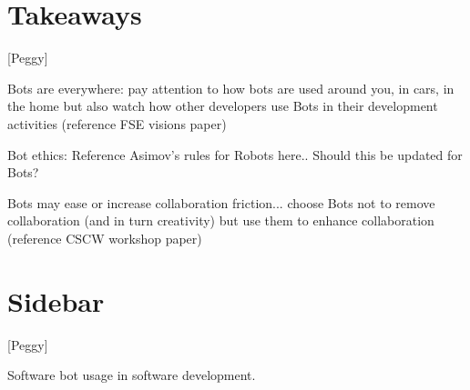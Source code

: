 \documentclass{sig-alternate}
\begin{document}
\section{Takeaways}

[Peggy]

	Bots are everywhere: pay attention to how bots are used around you, in cars, in the home but also watch how other developers use Bots in their development activities (reference FSE visions paper)
	
	Bot ethics:  Reference Asimov's rules for Robots here..   Should this be updated for Bots?
	
	Bots may ease or increase collaboration friction...  choose Bots not to remove collaboration (and in turn creativity) but use them to enhance collaboration (reference CSCW workshop paper)



\section{Sidebar}

[Peggy]

Software bot usage in software development.




%



%


%

\listoftodos
%
%
\end{document}
